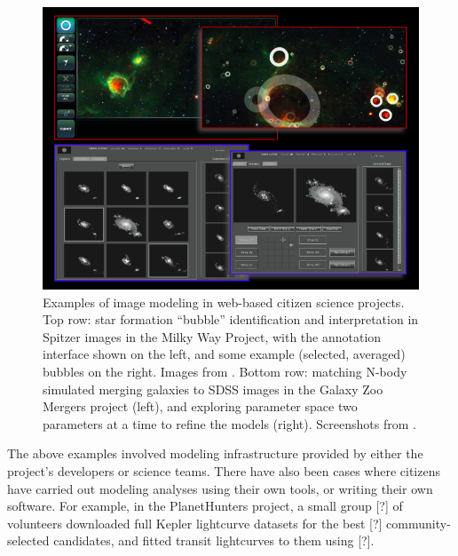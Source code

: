 \documentclass{ar2e}
\begin{document}
\begin{figure}[!ht]
\centering\includegraphics[width=\linewidth]{figs/modeling.png}
\caption{Examples of image modeling in web-based citizen science projects. Top
row: star formation ``bubble'' identification and interpretation in Spitzer
images in the Milky Way Project, with the annotation interface shown on the
left, and some example (selected, averaged) bubbles on the right. Images from
\citet{SimpsonEtal2012}. Bottom row: matching N-body simulated merging
galaxies to SDSS images in the Galaxy Zoo Mergers project (left), and
exploring parameter space two parameters at a time to refine the models
(right). Screenshots from \citet{HolincheckEtal2010}.}
\label{fig:modeling}
\end{figure}


The above examples involved modeling infrastructure provided by either the
project's developers or science teams. There have also been cases where
citizens have carried out modeling analyses using their own tools, or writing
their own software. For example, in the PlanetHunters project, a small group
[?] of volunteers downloaded full Kepler lightcurve datasets for the best [?]
community-selected candidates, and fitted transit lightcurves to them using
[?]. 

\end{document}
